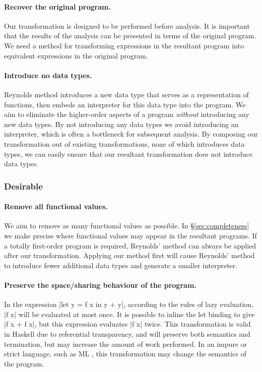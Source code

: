 \documentclass[preprint]{sigplanconf}
\begin{document}
\paragraph{Recover the original program.} Our transformation is designed to be performed before analysis. It is important that the results of the analysis can be presented in terms of the original program. We need a method for transforming expressions in the resultant program into equivalent expressions in the original program.

\paragraph{Introduce no data types.} Reynolds method introduces a new data type that serves as a representation of functions, then embeds an interpreter for this data type into the program. We aim to eliminate the higher-order aspects of a program \textit{without} introducing any new data types. By not introducing any data types we avoid introducing an interpreter, which is often a bottleneck for subsequent analysis. By composing our transformation out of existing transformations, none of which introduces data types, we can easily ensure that our resultant transformation does not introduce data types.


\subsubsection*{Desirable}

\paragraph{Remove all functional values.} We aim to remove as many functional values as possible. In \S\ref{sec:completeness} we make precise where functional values may appear in the resultant programs. If a totally first-order program is required, Reynolds' method can always be applied after our transformation. Applying our method first will cause Reynolds' method to introduce fewer additional data types and generate a smaller interpreter.

\paragraph{Preserve the space/sharing behaviour of the program.} In the expression |let y = f x in y + y|, according to the rules of lazy evaluation, |f x| will be evaluated at most once. It is possible to inline the let binding to give |f x + f x|, but this expression evaluates |f x| twice. This transformation is valid in Haskell due to referential transparency, and will preserve both semantics and termination, but may increase the amount of work performed. In an impure or strict language, such as ML \cite{ml}, this transformation may change the semantics of the program.
\end{document}
